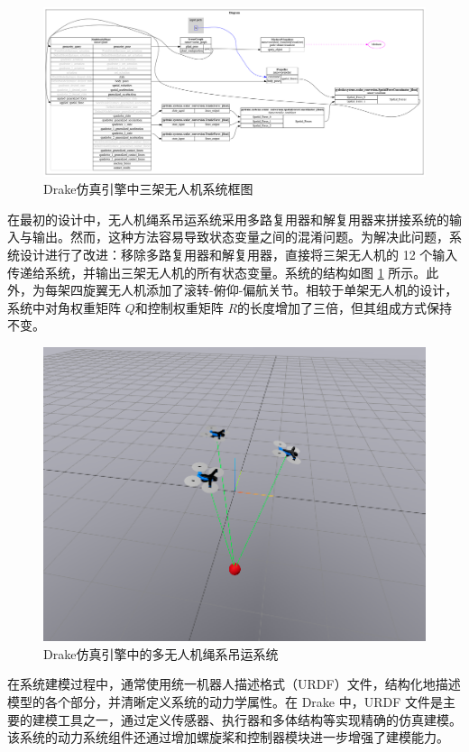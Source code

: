 \documentclass[lang=chs, degree=master, blindreview=true, winfonts=true]{yanputhesis}
\begin{document}
\begin{figure}[hbt!]
	\centering
	\includegraphics[width=38pc]{picture/drake.png} 
	\caption{Drake仿真引擎中三架无人机系统框图} 
	\label{drake}
\end{figure}
在最初的设计中，无人机绳系吊运系统采用多路复用器和解复用器来拼接系统的输入与输出。然而，这种方法容易导致状态变量之间的混淆问题。为解决此问题，系统设计进行了改进：移除多路复用器和解复用器，直接将三架无人机的 12 个输入传递给系统，并输出三架无人机的所有状态变量。系统的结构如图 \ref{drake} 所示。此外，为每架四旋翼无人机添加了滚转-俯仰-偏航关节。相较于单架无人机的设计，系统中对角权重矩阵 $Q$和控制权重矩阵 $R$的长度增加了三倍，但其组成方式保持不变。

\begin{figure}[hbt!]
	\centering
	\includegraphics[width=36pc]{picture/5_1.png} 
	\caption{Drake仿真引擎中的多无人机绳系吊运系统} 
	\label{5_1}
\end{figure}

在系统建模过程中，通常使用统一机器人描述格式（URDF）文件，结构化地描述模型的各个部分，并清晰定义系统的动力学属性。在 Drake 中，URDF 文件是主要的建模工具之一，通过定义传感器、执行器和多体结构等实现精确的仿真建模。该系统的动力系统组件还通过增加螺旋桨和控制器模块进一步增强了建模能力。
\end{document}

